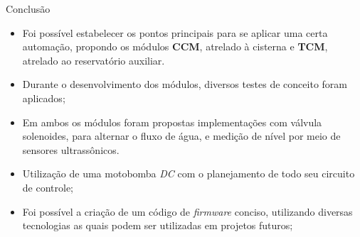 \begin{frame}{Conclusão}
\begin{itemize}
\item Foi possível estabelecer os pontos principais para se aplicar uma certa automação, propondo os módulos \textbf{CCM}, atrelado à cisterna e \textbf{TCM}, atrelado ao reservatório auxiliar.
\medskip
\item Durante o desenvolvimento dos módulos, diversos testes de conceito foram aplicados;
\medskip
\item Em ambos os módulos foram propostas implementações com válvula solenoides, para alternar o fluxo de água, e medição de nível por meio de sensores ultrassônicos.
\medskip
\item Utilização de uma motobomba \textit{DC} com o planejamento de todo seu circuito de controle;
\medskip
\item Foi possível a criação de um código de \textit{firmware} conciso, utilizando diversas tecnologias as quais podem ser utilizadas em projetos futuros;
\end{itemize}
    
\end{frame}

